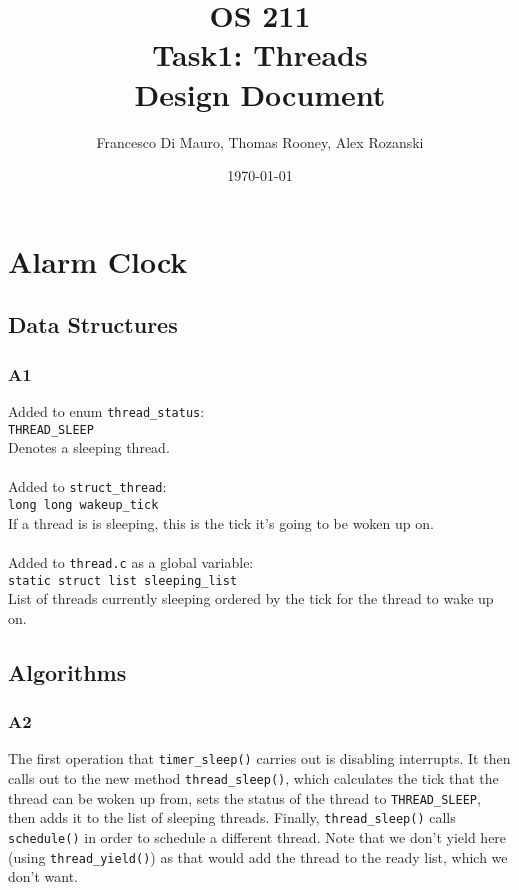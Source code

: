 \documentclass[a4wide, 11pt]{article}
\newcommand{\tab}{\hspace*{2em}}
\begin{document}
\title{OS 211 \\ Task1: Threads \\ Design Document}
\author{Francesco Di Mauro, Thomas Rooney, Alex Rozanski}
\date{\today}
\maketitle


\section{Alarm Clock}
\subsection{Data Structures}
\subsubsection{A1}

Added to enum \texttt{thread\_status}: \\
\tab \tab \texttt{THREAD\_SLEEP} \\
\tab \tab Denotes a sleeping thread.
\\\\
Added to \texttt{struct\_thread}: \\
\tab\tab \texttt{long long wakeup\_tick} \\
\tab\tab If a thread is is sleeping, this is the tick it's going to be woken up on.
\\\\
Added to \texttt{thread.c} as a global variable: \\
\tab\tab \texttt{static struct list sleeping\_list} \\
\tab\tab List of threads currently sleeping ordered by the tick for the thread to wake up on.

\subsection{Algorithms}
\subsubsection{A2}
The first operation that \texttt{timer\_sleep()} carries out is disabling interrupts. It then calls out to the new method \texttt{thread\_sleep()}, which calculates the tick that the thread can be woken up from, sets the status of the thread to \texttt{THREAD\_SLEEP}, then adds it to the list of sleeping threads. Finally, \texttt{thread\_sleep()} calls \texttt{schedule()} in order to schedule a different thread. Note that we don't yield here (using \texttt{thread\_yield()}) as that would add the thread to the ready list, which we don't want.
\end{document}
